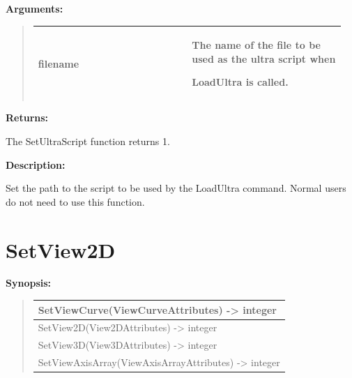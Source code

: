 \documentclass[letterpaper,10pt,english]{sphinxmanual}
\begin{document}
\begin{DUlineblock}{0em}
\item[] 
\item[] \textbf{Arguments:}
\end{DUlineblock}
\begin{quote}

\begin{tabular}{|p{0.475\linewidth}|p{0.475\linewidth}|}
\hline

filename
 & 
\begin{DUlineblock}{0em}
\item[] The name of the file to be used as the ultra script when
\item[] LoadUltra is called.
\end{DUlineblock}
\\
\hline\end{tabular}

\end{quote}

\begin{DUlineblock}{0em}
\item[] 
\item[] \textbf{Returns:}
\item[] The SetUltraScript function returns 1.
\item[] 
\item[] \textbf{Description:}
\item[] Set the path to the script to be used by the LoadUltra command. Normal users do
not need to use this function.
\end{DUlineblock}

\begin{DUlineblock}{0em}
\item[] 
\end{DUlineblock}


\section{SetView2D}
\label{functions:setview2d}
\begin{DUlineblock}{0em}
\item[] \textbf{Synopsis:}
\end{DUlineblock}
\begin{quote}

\begin{tabulary}{\linewidth}{|L|}
\hline

SetViewCurve(ViewCurveAttributes) -\textgreater{} integer
\\
\hline
SetView2D(View2DAttributes) -\textgreater{} integer
\\
\hline
SetView3D(View3DAttributes) -\textgreater{} integer
\\
\hline
SetViewAxisArray(ViewAxisArrayAttributes) -\textgreater{} integer
\\
\hline\end{tabulary}

\end{quote}
\end{document}
